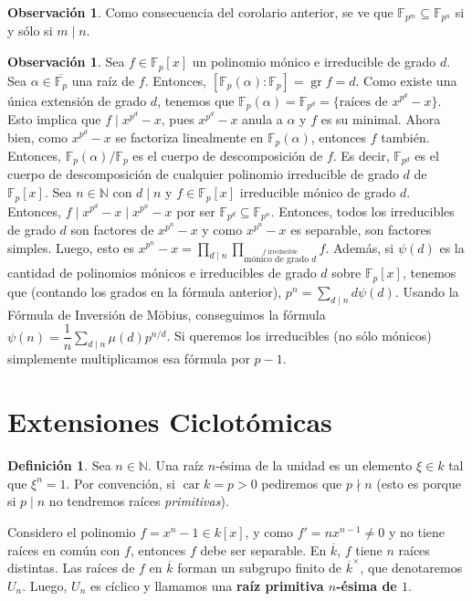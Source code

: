 \documentclass[12pt]{book}
\theoremstyle{definition}
\newtheorem{obs}[teo]{Observación}
\newtheorem{defn}[teo]{Definición}
\newcommand{\NN}{\mathbb{N}}
\newcommand{\FF}{\mathbb{F}}
\DeclareMathOperator{\gr}{gr}
\DeclareMathOperator{\car}{car}
\begin{document}
\begin{obs}
Como consecuencia del corolario anterior, se ve que $\FF_{p^m}\subseteq \FF_{p^n}$ si y sólo si $m\mid n$.
\end{obs}

\begin{obs}
Sea $f\in\FF_p[x]$ un polinomio mónico e irreducible de grado $d$. Sea $\alpha\in\overline{\FF_p}$ una raíz de $f$. Entonces, $[\FF_p(\alpha):\FF_p] = \gr f = d$. Como existe una única extensión de grado $d$, tenemos que $\FF_p(\alpha) = \FF_{p^d} = \{\text{raíces de }x^{p^d}-x\}$. Esto implica que $f\mid x^{p^d}-x$, pues $x^{p^d}-x$ anula a $\alpha$ y $f$ es su minimal. Ahora bien, como $x^{p^d}-x$ se factoriza linealmente en $\FF_p(\alpha)$, entonces $f$ también. Entonces, $\FF_p(\alpha)/\FF_p$ es el cuerpo de descomposición de $f$. Es decir, $\FF_{p^d}$ es el cuerpo de descomposición de cualquier polinomio irreducible de grado $d$ de $\FF_p[x]$. Sea $n\in\NN$ con $d\mid n$ y $f\in\FF_p[x]$ irreducible mónico de grado $d$. Entonces, $f\mid x^{p^d}-x \mid x^{p^n}-x$ por ser $\FF_{p^d}\subseteq \FF_{p^n}$. Entonces, todos los irreducibles de grado $d$ son factores de $x^{p^n}-x$ y como $x^{p^n}-x$ es separable, son factores simples. Luego, esto es $x^{p^n} - x = \displaystyle\prod_{d\mid n}\displaystyle\prod_{\stackrel{f\text{ irreducible}}{\text{mónico de grado }d}}f$. Además, si $\psi(d)$ es la cantidad de polinomios mónicos e irreducibles de grado $d$ sobre $\FF_p[x]$, tenemos que (contando los grados en la fórmula anterior), $p^n = \displaystyle\sum_{d\mid n}d\psi(d)$. Usando la Fórmula de Inversión de Möbius, conseguimos la fórmula $\psi(n) = \dfrac{1}{n}\displaystyle\sum_{d\mid n}\mu(d)p^{n/d}$. Si queremos los irreducibles (no sólo mónicos) simplemente multiplicamos esa fórmula por $p-1$.
\end{obs}

\section{Extensiones Ciclotómicas}

\begin{defn}
Sea $n\in\NN$. Una raíz $n$-ésima de la unidad es un elemento $\xi\in k$ tal que $\xi^n =1$. Por convención, si $\car k = p > 0$ pediremos que $p\nmid n$ (esto es porque si $p\mid n$ no tendremos raíces \textit{primitivas}).

Considero el polinomio $f=x^n - 1 \in k[x]$, y como $f'=nx^{n-1}\neq 0$ y no tiene raíces en común con $f$, entonces $f$ debe ser separable. En $\overline{k}$, $f$ tiene $n$ raíces distintas. Las raíces de $f$ en $\overline{k}$ forman un subgrupo finito de $\overline{k}^\times$, que denotaremos $U_n$. Luego, $U_n$ es cíclico y llamamos una \textbf{raíz primitiva $n$-ésima de $1$}.
\end{defn}
\end{document}
